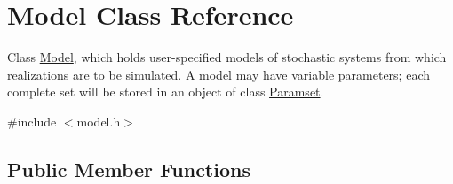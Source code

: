 \hypertarget{class_model}{}\section{Model Class Reference}
\label{class_model}


Class \hyperlink{class_model}{Model}, which holds user-\/specified models of stochastic systems from which realizations are to be simulated. A model may have variable parameters; each complete set will be stored in an object of class \hyperlink{class_paramset}{Paramset}.  




{\ttfamily \#include $<$model.\+h$>$}

\subsection*{Public Member Functions}
